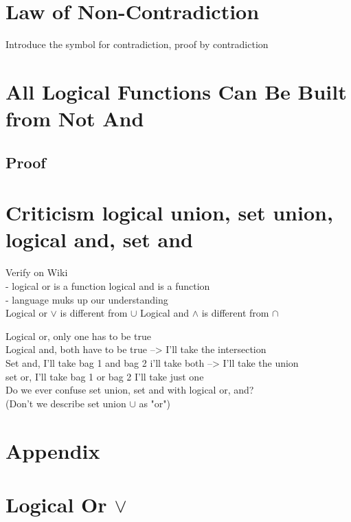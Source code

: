 \documentclass[11pt]{article}
\begin{document}
\section{Law of Non-Contradiction}
\begin{center}
Introduce the symbol for contradiction, proof by contradiction
\end{center}




\newpage
\section{All Logical Functions Can Be Built from Not And}
\subsection{Proof}






\section{Criticism logical union, set union, logical and, set and}
Verify on Wiki \\
- logical or is a function logical and is a function\\
- language muks up our understanding\\

Logical or $\lor$ is different from $\cup$
Logical and $\land$ is different from $\cap$

Logical or, only one has to be true\\
Logical and, both have to be true --> I'll take the intersection\\

Set and, I'll take bag 1 and bag 2 i'll take both --> I'll take the union\\
set or, I'll take bag 1 or bag 2 I'll take just one\\

Do we ever confuse set union, set and with logical or, and?\\
(Don't we describe set union $\cup$ as "or")




\newpage
\section*{Appendix}


\section{Logical Or $\lor$}
\end{document}
